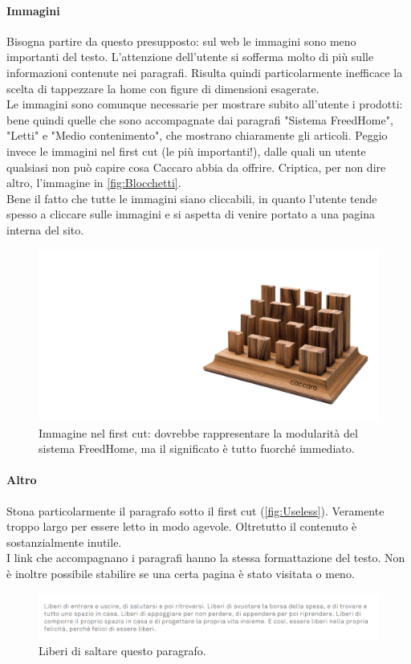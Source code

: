 
\paragraph*{Immagini}
Bisogna partire da questo presupposto: sul web le immagini sono meno importanti del testo. L'attenzione dell'utente si sofferma molto di più sulle informazioni contenute nei paragrafi.
Risulta quindi particolarmente inefficace la scelta di tappezzare la home con figure di dimensioni esagerate.\\
Le immagini sono comunque necessarie per mostrare subito all'utente i prodotti: bene quindi quelle che sono accompagnate dai paragrafi "Sistema FreedHome", "Letti" e "Medio contenimento", che mostrano chiaramente gli articoli. Peggio invece le immagini nel first cut (le più importanti!), dalle quali un utente qualsiasi non può capire cosa Caccaro abbia da offrire. Criptica, per non dire altro, l'immagine in \autoref{fig:Blocchetti}.\\
Bene il fatto che tutte le immagini siano cliccabili, in quanto l'utente tende spesso a cliccare sulle immagini e si aspetta di venire portato a una pagina interna del sito.

\begin{figure}[H]
	\centering
	\includegraphics[width=\textwidth]{sez/HomePage/img/Blocchetti.jpg}
	\caption[https://www.caccaro.com/]{Immagine nel first cut: dovrebbe rappresentare la modularità del sistema FreedHome, ma il significato è tutto fuorché immediato.}
	\label{fig:Blocchetti}
\end{figure}

\paragraph*{Altro} Stona particolarmente il paragrafo sotto il first cut (\autoref{fig:Useless}). Veramente troppo largo per essere letto in modo agevole. Oltretutto il contenuto è sostanzialmente inutile.\\
I link che accompagnano i paragrafi hanno la stessa formattazione del testo. Non è inoltre possibile stabilire se una certa pagina è stato visitata o meno.

\begin{figure}[H]
	\centering
	\includegraphics[width=\textwidth]{sez/HomePage/img/Useless.png}
	\caption[https://www.caccaro.com/]{Liberi di saltare questo paragrafo.}
	\label{fig:Useless}
\end{figure}

